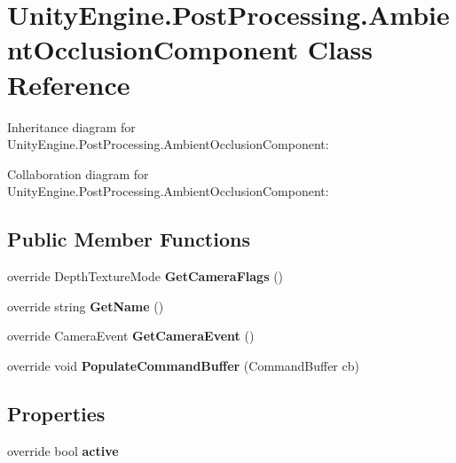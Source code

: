 \hypertarget{class_unity_engine_1_1_post_processing_1_1_ambient_occlusion_component}{}\section{Unity\+Engine.\+Post\+Processing.\+Ambient\+Occlusion\+Component Class Reference}
\label{class_unity_engine_1_1_post_processing_1_1_ambient_occlusion_component}


Inheritance diagram for Unity\+Engine.\+Post\+Processing.\+Ambient\+Occlusion\+Component\+:


Collaboration diagram for Unity\+Engine.\+Post\+Processing.\+Ambient\+Occlusion\+Component\+:
\subsection*{Public Member Functions}
\begin{DoxyCompactItemize}
\item 
\mbox{\label{class_unity_engine_1_1_post_processing_1_1_ambient_occlusion_component_ad75fa4a0898e2d84ffaa842433864c79}} 
override Depth\+Texture\+Mode {\bfseries Get\+Camera\+Flags} ()
\item 
\mbox{\label{class_unity_engine_1_1_post_processing_1_1_ambient_occlusion_component_a912e17f44f887c19511e31cb4211551c}} 
override string {\bfseries Get\+Name} ()
\item 
\mbox{\label{class_unity_engine_1_1_post_processing_1_1_ambient_occlusion_component_a40c2e1160a63cb63a910d9e232515001}} 
override Camera\+Event {\bfseries Get\+Camera\+Event} ()
\item 
\mbox{\label{class_unity_engine_1_1_post_processing_1_1_ambient_occlusion_component_a5f64f7638a6a441cf4bdaeb54dbf1601}} 
override void {\bfseries Populate\+Command\+Buffer} (Command\+Buffer cb)
\end{DoxyCompactItemize}
\subsection*{Properties}
\begin{DoxyCompactItemize}
\item 
\mbox{\label{class_unity_engine_1_1_post_processing_1_1_ambient_occlusion_component_a5fa0bbd6818c812f5ffb524b6467fb5c}} 
override bool {\bfseries active}
\end{DoxyCompactItemize}



